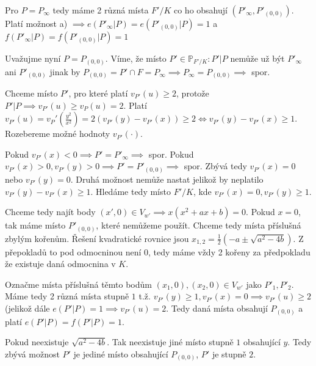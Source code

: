 \documentclass[12pt, a4paper]{article}
\begin{document}
\begin{enumerate}[label=(\alph*)]
    Pro $P=P_\infty$ tedy máme 2 různá místa $F'/K$ co ho obsahují $(P'_\infty, P'_{(0,0)})$. Platí možnost a) $\implies e(P'_\infty|P)=e(P'_{(0,0)}|P)=1$ a $f(P'_\infty|P)=f(P'_{(0,0)}|P)=1$

    Uvažujme nyní $P = P_{(0,0)}$. Víme, že místo $P' \in \mathbb{P}_{F'/K}: P'|P$ nemůže už být $P'_\infty$ ani $P'_{(0,0)}$ jinak by $P_{(0,0)} = P' \cap F = P_\infty \implies P_\infty = P_{(0,0)} \implies$ spor.

    Chceme místo $P'$, pro které platí $v_{P'}(u) \ge 2$, protože $P'|P \implies v_{P'}(u)\ge v_P(u)=2$. Platí $v_{P'}(u)=v_P'(\frac{y^2}{x^2}) = 2 (v_{P'}(y)-v_{P'}(x)) \ge 2 \iff v_{P'}(y)-v_{P'}(x) \ge 1$. Rozebereme možné hodnoty $v_{P'}(\cdot)$.

    Pokud $v_{P'}(x) < 0 \implies P' = P'_\infty \implies$ spor. Pokud $v_{P'}(x) > 0, v_{P'}(y) > 0 \implies P' = P'_{(0,0)} \implies $ spor. Zbývá tedy $v_{P'}(x) = 0$ nebo $v_{P'}(y)=0$. Druhá možnost nemůže nastat jelikož by neplatilo $v_{P'}(y)-v_{P'}(x) \ge 1$. Hledáme tedy místo $F'/K$, kde $v_{P'}(x) = 0, v_{P'}(y) \ge 1$.

    Chceme tedy najít body $(x', 0) \in V_{w'} \implies x(x^2+ax+b)= 0$. Pokud $x = 0$, tak máme místo $P'_{(0,0)}$, které nemůžeme použít. Chceme tedy místa příslušná zbylým kořenům. Řešení kvadratické rovnice jsou $x_{1,2}=\frac{1}{2}(-a\pm \sqrt{a^2-4b})$. Z přepokladů to pod odmocninou není 0, tedy máme vždy 2 kořeny za předpokladu že existuje daná odmocnina v $K$.

    Označme místa příslušná těmto bodům $(x_1, 0), (x_2, 0) \in  V_{w'}$ jako $P'_1, P'_2$. Máme tedy 2 různá místa stupně $1$ t.ž. $v_{P'}(y)\geq 1, v_{P'}(x)=0 \implies v_{P'}(u)\geq 2$ (jelikož dále $e(P'|P)=1 \implies v_{P'}(u)=2$. Tedy daná místa obsahují $P_{(0,0)}$ a platí $e(P'|P)=f(P'|P)=1$.

    Pokud neexistuje $\sqrt{a^2-4b}$. Tak neexistuje jiné místo stupně $1$ obsahující $y$. Tedy zbývá možnost $P'$ je jediné místo obsahující $P_{(0,0)}$, $P'$ je stupně $2$.
 
\end{enumerate}
\end{document}
